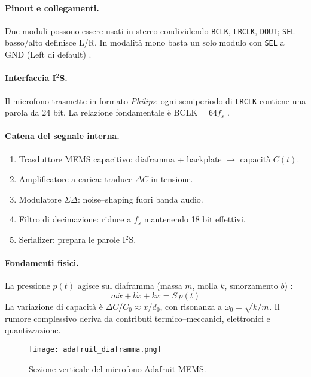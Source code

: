 \paragraph{Pinout e collegamenti.} 
Due moduli possono essere usati in stereo condividendo \texttt{BCLK}, \texttt{LRCLK}, \texttt{DOUT}; \texttt{SEL} basso/alto definisce L/R. 
In modalità mono basta un solo modulo con \texttt{SEL} a GND (Left di default) \citep{adafruit-sph0645-datasheet}.

\paragraph{Interfaccia I$^2$S.} 
Il microfono trasmette in formato \emph{Philips}: ogni semiperiodo di \texttt{LRCLK} contiene una parola da 24 bit. 
La relazione fondamentale è $\mathrm{BCLK}=64f_s$ \citep{nordic-devzone}. 

\paragraph{Catena del segnale interna.}
\begin{enumerate}
  \item Trasduttore MEMS capacitivo: diaframma + backplate $\to$ capacità $C(t)$.
  \item Amplificatore a carica: traduce $\Delta C$ in tensione.
  \item Modulatore $\Sigma\Delta$: noise–shaping fuori banda audio.
  \item Filtro di decimazione: riduce a $f_s$ mantenendo 18 bit effettivi.
  \item Serializer: prepara le parole I$^2$S.
\end{enumerate}

\newpage
\paragraph{Fondamenti fisici.}
La pressione $p(t)$ agisce sul diaframma (massa $m$, molla $k$, smorzamento $b$) \citep[pp.~192--195]{mems-acoustics}:
\[
m\ddot{x}+b\dot{x}+kx=S\,p(t)
\]
La variazione di capacità è $\Delta C/C_0 \approx x/d_0$, con risonanza a $\omega_0=\sqrt{k/m}$. 
Il rumore complessivo deriva da contributi termico–meccanici, elettronici e quantizzazione. 
\begin{figure}[H]
  \centering
  \texttt{[image: adafruit\_diaframma.png]}
  \caption{Sezione verticale del microfono Adafruit MEMS.}
  \label{fig:adafruit_diaframma}
  \end{figure}

